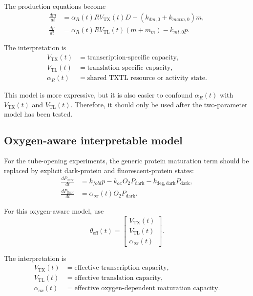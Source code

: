 \documentclass[11pt]{article}
\newcommand{\TX}{\mathrm{TX}}
\newcommand{\TL}{\mathrm{TL}}
\newcommand{\dark}{\mathrm{dark}}
\newcommand{\fluor}{\mathrm{fluor}}
\begin{document}
The production equations become
\begin{align}
    \frac{dm}{dt}
    &=
    \alpha_R(t)R V_{\TX}(t)D
    -(k_{dm,0}+k_{matm,0})m, \\
    \frac{dp}{dt}
    &=
    \alpha_R(t)R V_{\TL}(t)(m+m_m)
    -k_{mt,0}p.
\end{align}

The interpretation is
\begin{align}
    V_{\TX}(t) &= \text{transcription-specific capacity}, \\
    V_{\TL}(t) &= \text{translation-specific capacity}, \\
    \alpha_R(t) &= \text{shared TXTL resource or activity state}.
\end{align}

This model is more expressive, but it is also easier to confound $\alpha_R(t)$ with $V_{\TX}(t)$ and $V_{\TL}(t)$. Therefore, it should only be used after the two-parameter model has been tested.

\subsection{Oxygen-aware interpretable model}

For the tube-opening experiments, the generic protein maturation term should be replaced by explicit dark-protein and fluorescent-protein states:
\begin{align}
    \frac{dP_{\dark}}{dt}
    &=
    k_{fold}p
    -k_{ox}O_2P_{\dark}
    -k_{\mathrm{deg,dark}}P_{\dark}, \\
    \frac{dP_{\fluor}}{dt}
    &=
    \alpha_{ox}(t)O_2P_{\dark}.
\end{align}

For this oxygen-aware model, use
\begin{equation}
    \theta_{\mathrm{eff}}(t)=
    \begin{bmatrix}
        V_{\TX}(t)\\
        V_{\TL}(t)\\
        \alpha_{ox}(t)
    \end{bmatrix}.
\end{equation}

The interpretation is
\begin{align}
    V_{\TX}(t) &= \text{effective transcription capacity}, \\
    V_{\TL}(t) &= \text{effective translation capacity}, \\
    \alpha_{ox}(t) &= \text{effective oxygen-dependent maturation capacity}.
\end{align}
\end{document}
